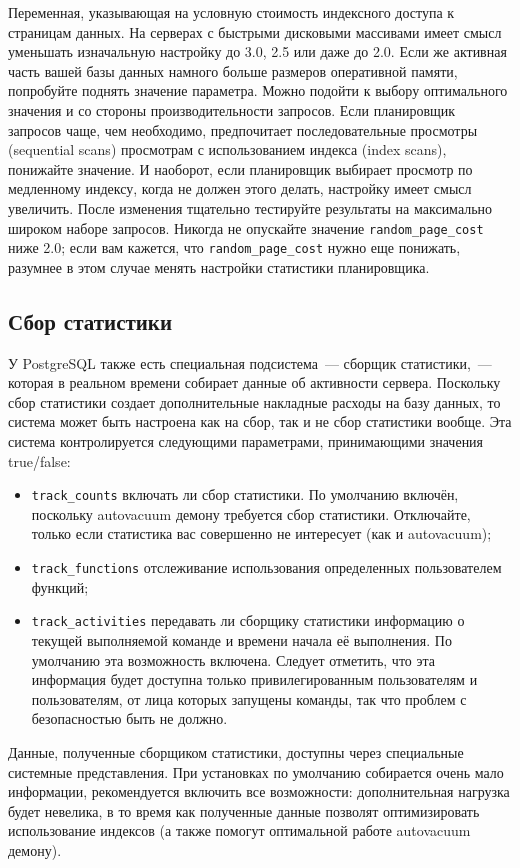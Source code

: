 \begin{itemize}
  Переменная, указывающая на условную стоимость индексного доступа к страницам данных. На серверах с быстрыми дисковыми массивами имеет смысл уменьшать изначальную настройку до 3.0, 2.5 или даже до 2.0. Если же активная часть вашей базы данных намного больше размеров оперативной памяти, попробуйте поднять значение параметра. Можно подойти к выбору оптимального значения и со стороны производительности запросов. Если планировщик запросов чаще, чем необходимо, предпочитает последовательные просмотры (sequential scans) просмотрам с использованием индекса (index scans), понижайте значение. И наоборот, если планировщик выбирает просмотр по медленному индексу, когда не должен этого делать, настройку имеет смысл увеличить. После изменения тщательно тестируйте результаты на максимально широком наборе запросов. Никогда не опускайте значение \lstinline!random_page_cost! ниже 2.0; если вам кажется, что \lstinline!random_page_cost! нужно еще понижать, разумнее в этом случае менять настройки статистики планировщика.
\end{itemize}


\subsection{Сбор статистики}


У PostgreSQL также есть специальная подсистема~--- сборщик статистики,~--- которая в реальном времени собирает данные об активности сервера. Поскольку сбор статистики создает дополнительные накладные расходы на базу данных, то система может быть настроена как на сбор, так и не сбор статистики вообще. Эта система контролируется следующими параметрами, принимающими значения true/false:

\begin{itemize}
  \item \lstinline!track_counts! включать ли сбор статистики. По умолчанию включён, поскольку autovacuum демону требуется сбор статистики. Отключайте, только если статистика вас совершенно не интересует (как и autovacuum);
  \item \lstinline!track_functions! отслеживание использования определенных пользователем функций;
  \item \lstinline!track_activities! передавать ли сборщику статистики информацию о текущей выполняемой команде и времени начала её выполнения. По умолчанию эта возможность включена. Следует отметить, что эта информация будет доступна только привилегированным пользователям и пользователям, от лица которых запущены команды, так что проблем с безопасностью быть не должно.
\end{itemize}

Данные, полученные сборщиком статистики, доступны через специальные системные представления. При установках по умолчанию собирается очень мало информации, рекомендуется включить все возможности: дополнительная нагрузка будет невелика, в то время как полученные данные позволят оптимизировать использование индексов (а также помогут оптимальной работе autovacuum демону).